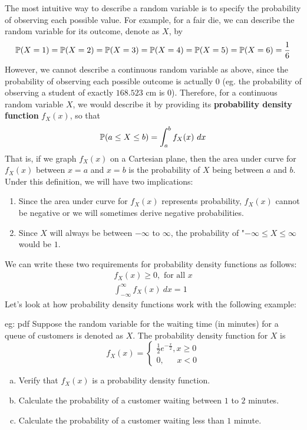 The most intuitive way to describe a random variable is to specify the probability of observing each possible value.  For example, for a fair die, we can describe the random variable for its outcome, denote as $X$, by
\[\mathbb{P}(X=1) = \mathbb{P}(X=2) = \mathbb{P}(X=3) = \mathbb{P}(X=4) = \mathbb{P}(X=5) = \mathbb{P}(X=6) = \frac{1}{6}\]
However, we cannot describe a continuous random variable as above, since the probability of observing each possible outcome is actually $0$ (eg. the probability of observing a student of exactly $168.523$ cm is $0$).  Therefore, for a continuous random variable $X$, we would describe it by providing its \textbf{probability density function} $f_X(x)$, so that
\[\mathbb{P}(a \le X \le b) = \int_a^b f_X(x)~dx\]
That is, if we graph $f_X(x)$ on a Cartesian plane, then the area under curve for $f_X(x)$ between $x=a$ and $x=b$ is the probability of $X$ being between $a$ and $b$.  Under this definition, we will have two implications:
\begin{enumerate}
    \item Since the area under curve for $f_X(x)$ represents probability, $f_X(x)$ cannot be negative or we will sometimes derive negative probabilities.
    \item Since $X$ will always be between $-\infty$ to $\infty$, the probability of "$-\infty \le X \le \infty$ would be $1$.
\end{enumerate}
We can write these two requirements for probability density functions as follows:
\begin{gather*}
    f_X(x) \ge 0, \text{ for all }x\\
    \int_{-\infty}^{\infty} f_X(x)~dx = 1
\end{gather*}
Let's look at how probability density functions work with the following example:
\begin{eg}[]{eg: pdf}
    Suppose the random variable for the waiting time (in minutes) for a queue of customers is denoted as $X$.  The probability density function for $X$ is 
    \[f_X(x) = \begin{cases}
        \frac{1}{2}e^{-\frac{x}{2}}, x \ge 0\\
        0, \quad \;\; x < 0
    \end{cases}\]
    \begin{enumerate}[a)]
        \item Verify that $f_X(x)$ is a probability density function.
        \item Calculate the probability of a customer waiting between $1$ to $2$ minutes.
        \item Calculate the probability of a customer waiting less than $1$ minute.
    \end{enumerate}
\end{eg}

